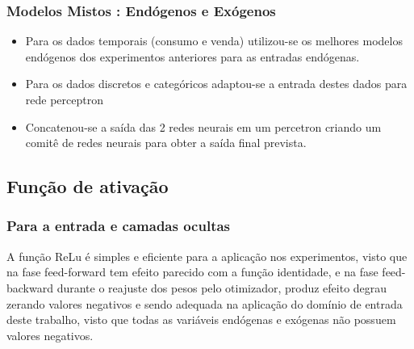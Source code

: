            \subsubsection{Modelos Mistos : Endógenos e Exógenos}
                \begin{itemize}
                    \item Para os dados temporais (consumo e venda) utilizou-se os melhores modelos endógenos dos experimentos anteriores para as entradas endógenas. 
                    \item Para os dados discretos e categóricos adaptou-se a entrada destes dados para rede perceptron
                    \item  Concatenou-se a saída das 2 redes neurais em um percetron criando um comitê de redes neurais para obter a saída final prevista.
                \end{itemize}
	\subsection{Função de ativação}
	    \begin{figure}[H]
        	 \label{fig:activation_functions}
        \end{figure}
	    \subsubsection{Para a entrada e camadas ocultas}
    	    A função ReLu é simples e eficiente para a aplicação nos experimentos, visto que na fase feed-forward tem efeito parecido com a função identidade, e na fase feed-backward durante o reajuste dos pesos pelo otimizador, produz efeito degrau zerando valores negativos e sendo adequada na aplicação do domínio de entrada deste trabalho, visto que todas as variáveis endógenas e exógenas não possuem valores negativos.

